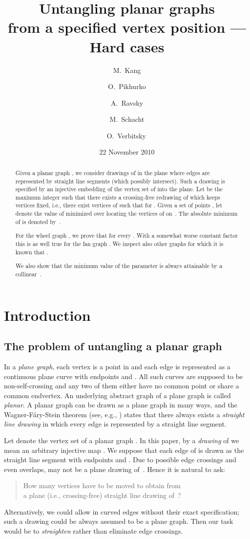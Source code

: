 \documentclass[reqno,12pt]{amsart}
\title{Untangling planar graphs\\ from a specified vertex position
--- Hard cases}
\author{M.~Kang}
\author{O.~Pikhurko}
\author{A.~Ravsky}
\author{M.~Schacht}
\author{O.~Verbitsky\,}
\date{22 November 2010}
\begin{document}
 

\begin{abstract}
Given a planar graph ,
we consider drawings of  in the plane where edges are represented
by straight line segments (which possibly intersect).
Such a drawing is specified by an injective embedding 
of the vertex set of  into the plane.
Let  be the maximum integer   such that there exists
a crossing-free redrawing  of  which keeps  vertices
fixed, i.e., there exist  vertices  of  such that 
 for . Given a set of points , let
 denote the value of  minimized over 
locating the vertices of  on~.
The absolute minimum of  is denoted by~.

For the wheel graph , we prove that 
for every . With a somewhat worse constant factor this is as well true
for the fan graph . 
We inspect also other graphs for which it is known that .

We also show that the minimum value  of the parameter
 is always attainable by a collinear~.
\end{abstract}

\maketitle


\section{Introduction}\label{s:intro}
\subsection{The problem of untangling a planar graph}
In a \emph{plane graph}, each vertex  
is a point in   and each edge  
is represented as a continuous plane curve with endpoints  and .
All such curves are supposed to be non-self-crossing and any two of them
either have no common point or share a common endvertex.
An underlying abstract graph of a plane graph is called \emph{planar}.
A planar graph can be drawn as a plane graph in many ways, and
the Wagner-F\'ary-Stein theorem (see, e.g., \cite{NRa})
states that there always exists a \emph{straight line drawing}
in which every edge is represented by a straight line segment.

Let  denote the vertex set of a planar graph . In this paper,
by a \emph{drawing} of  we mean an arbitrary injective map
. We suppose that each edge 
of  is drawn as the straight line segment with endpoints 
and .
Due to possible edge crossings and even overlaps,
 may not be a plane drawing of~. Hence it is natural to ask:
\begin{quote}
How many vertices have to be moved to obtain from \\
a plane (i.e., crossing-free) straight line drawing of~?
\end{quote}
Alternatively, we could 
allow in  curved edges without their exact specification; such a drawing 
could be always assumed to be a plane graph. Then our task would be
to \emph{straighten}  rather than eliminate edge crossings.
\end{document}
